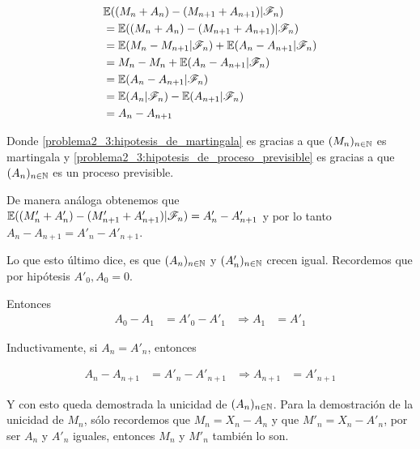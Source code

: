 \begin{align}
                                                    & \mathbb{E}((M_n + A_n) -( M_{n+1} + A_{n+1}) | \mathscr{F}_n)                                              \\ 
                                                    &=  \mathbb{E}((M_n + A_n) -( M_{n+1} + A_{n+1}) | \mathscr{F}_n)                                            \\
                                                    &=  \mathbb{E}(M_n - M_{n+1}| \mathscr{F}_n) + \mathbb{E}(A_n - A_{n+1} | \mathscr{F}_n)                                      \\
                                                    &=  M_n - M_{n} + \mathbb{E}(A_n - A_{n+1} | \mathscr{F}_n) \label{problema2_3:hipotesis_de_martingala}      \\
                                                    &=  \mathbb{E}(A_n - A_{n+1} | \mathscr{F}_n)                                                                \\
                                                    &=  \mathbb{E}(A_n| \mathscr{F}_n) - \mathbb{E}(A_{n+1} | \mathscr{F}_n)                                                      \\
                                                    &=  A_n - A_{n+1} \label{problema2_3:hipotesis_de_proceso_previsible}                                                                               
\end{align}\pn

Donde \eqref{problema2_3:hipotesis_de_martingala} es gracias a que $(M_n)_{n\in\mathbb{N}}$ es martingala y \eqref{problema2_3:hipotesis_de_proceso_previsible}
es gracias a que $(A_n)_{n\in\mathbb{N}}$ es un proceso previsible.\pn

De manera análoga obtenemos que $\mathbb{E}((M'_n + A'_n) - (M'_{n+1} + A'_{n+1}) | \mathscr{F}_n) = A'_n - A'_{n+1}$ y por lo tanto $A_n - A_{n+1} = A'_n - A'_{n+1}$.\pn

Lo que esto último dice, es que $(A_n)_{n\in\mathbb{N}}$ y $(A'_n)_{n\in\mathbb{N}}$ crecen igual. Recordemos que por hipótesis $A'_0, A_0 = 0$.\pn

Entonces
\begin{align}
    A_0 - A_1 &= A'_0 - A'_1 &\Rightarrow A_1 &= A'_1
\end{align}\pn

Inductivamente, si $A_n = A'_n$, entonces
           
\begin{align}
    A_n - A_{n+1} &= A'_n - A'_{n+1} &\Rightarrow A_{n+1} &= A'_{n+1}
\end{align}                                                                                                         

Y con esto queda demostrada la unicidad de $(A_n)_{n\in\mathbb{N}}$. Para la demostración de la unicidad de $M_n$, sólo recordemos que 
$M_n = X_n - A_n$ y que $M'_n = X_n - A'_n$, por ser $A_n$ y $A'_n$ iguales, entonces $M_n$ y $M'_n$ también lo son.